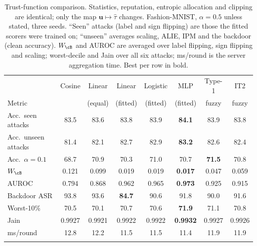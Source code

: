 \begin{table}[!tbp]
\centering
\caption{Trust-function comparison. Statistics, reputation, entropic allocation and clipping are identical; only the map $\mathbf u\mapsto\hat\tau$ changes. Fashion-MNIST, $\alpha=0.5$ unless stated, three seeds. ``Seen'' attacks (label and sign flipping) are those the fitted scorers were trained on; ``unseen'' averages scaling, ALIE, IPM and the backdoor (clean accuracy). $W_\cB$ and AUROC are averaged over label flipping, sign flipping and scaling; worst-decile and Jain over all six attacks; ms/round is the server aggregation time. Best per row in bold.}
\label{tab:trustfn}
\setlength{\tabcolsep}{2.6pt}
\footnotesize
\begin{tabular}{@{}lccccccc@{}}
\toprule
 & Cosine & Linear & Linear & Logistic & MLP & Type-1 & IT2 \\
Metric &  & (equal) & (fitted) & (fitted) & (fitted) & fuzzy & fuzzy\\
\midrule
Acc.\ seen attacks & 83.5 & 83.6 & 83.8 & 83.9 & \textbf{84.1} & 83.9 & 83.8\\
Acc.\ unseen attacks & 81.4 & 82.1 & 82.7 & 82.9 & \textbf{83.2} & 82.6 & 82.4\\
Acc.\ $\alpha=0.1$ & 68.7 & 70.9 & 70.3 & 71.0 & 70.7 & \textbf{71.5} & 70.8\\
$W_\cB$ & 0.121 & 0.099 & 0.019 & 0.019 & \textbf{0.017} & 0.047 & 0.059\\
AUROC & 0.794 & 0.868 & 0.962 & 0.965 & \textbf{0.973} & 0.925 & 0.915\\
Backdoor ASR & 93.8 & 93.6 & \textbf{84.7} & 90.6 & 91.8 & 90.0 & 91.6\\
Worst-10\% & 70.5 & 70.1 & 70.7 & 70.6 & \textbf{71.9} & 71.1 & 70.8\\
Jain & 0.9927 & 0.9921 & 0.9922 & 0.9922 & \textbf{0.9932} & 0.9927 & 0.9926\\
ms/round & 12.8 & 12.2 & 11.5 & 11.5 & 11.4 & 11.9 & 11.9\\
\botrule
\end{tabular}
\end{table}
